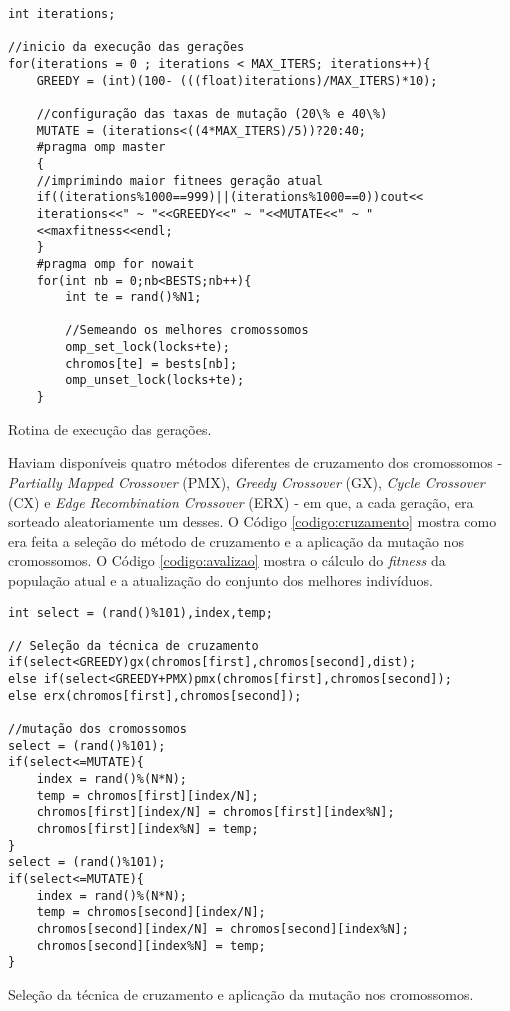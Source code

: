 \begin{codigo}[!htb]
	\begin{Verbatim}
int iterations; 
	
//inicio da execução das gerações 
for(iterations = 0 ; iterations < MAX_ITERS; iterations++){
	GREEDY = (int)(100- (((float)iterations)/MAX_ITERS)*10);
	
	//configuração das taxas de mutação (20\% e 40\%)      
	MUTATE = (iterations<((4*MAX_ITERS)/5))?20:40;
	#pragma omp master                                            
	{
	//imprimindo maior fitnees geração atual									
	if((iterations%1000==999)||(iterations%1000==0))cout<<
	iterations<<" ~ "<<GREEDY<<" ~ "<<MUTATE<<" ~ "
	<<maxfitness<<endl;
	}
	#pragma omp for nowait
	for(int nb = 0;nb<BESTS;nb++){    		
		int te = rand()%N1;
	
		//Semeando os melhores cromossomos				
		omp_set_lock(locks+te);
		chromos[te] = bests[nb];
		omp_unset_lock(locks+te);	
	}
	\end{Verbatim}
	\caption{Rotina de execução das gerações.} \label{codigo:inicio_geraceos}
\end{codigo}

Haviam disponíveis quatro métodos diferentes de cruzamento dos cromossomos - \textit{Partially Mapped Crossover} (PMX), \textit{Greedy Crossover} (GX), \textit{Cycle Crossover} (CX) e \textit{Edge Recombination Crossover} (ERX) - em que, a cada geração, era sorteado aleatoriamente um desses. O Código \ref{codigo:cruzamento} mostra como era feita a seleção do método de cruzamento e a aplicação da mutação nos cromossomos. O Código \ref{codigo:avalizao} mostra o cálculo do \textit{fitness} da população atual e a atualização do conjunto dos melhores indivíduos.

\begin{codigo}[!htb]
	\begin{Verbatim}
int select = (rand()%101),index,temp;
			
// Seleção da técnica de cruzamento	
if(select<GREEDY)gx(chromos[first],chromos[second],dist);	
else if(select<GREEDY+PMX)pmx(chromos[first],chromos[second]);
else erx(chromos[first],chromos[second]);
			
//mutação dos cromossomos
select = (rand()%101);			
if(select<=MUTATE){			
	index = rand()%(N*N);
	temp = chromos[first][index/N];
	chromos[first][index/N] = chromos[first][index%N];
	chromos[first][index%N] = temp;
}
select = (rand()%101);
if(select<=MUTATE){
	index = rand()%(N*N);
	temp = chromos[second][index/N];
	chromos[second][index/N] = chromos[second][index%N];
	chromos[second][index%N] = temp;
}
	\end{Verbatim}
	\caption{Seleção da técnica de cruzamento e aplicação da mutação nos cromossomos.} \label{codigo:cruzamento}
\end{codigo}


